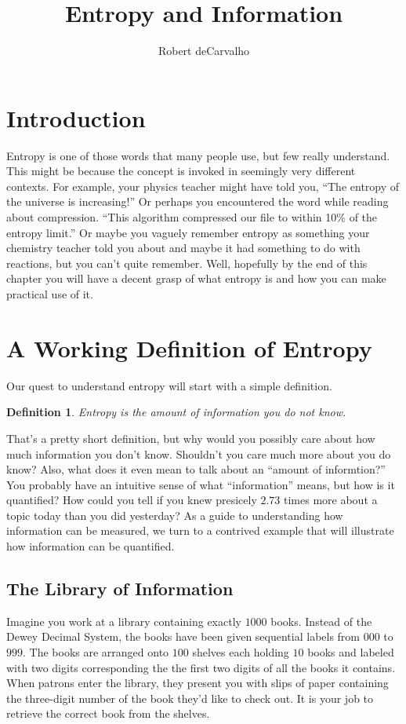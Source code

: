 \documentclass[11pt, oneside]{article}   	%
\title{Entropy and Information}
\author{Robert deCarvalho}
\date{}							%
\newtheorem{definition}{Definition}
\begin{document}
\maketitle


\section{Introduction}
Entropy is one of those words that many people use, but few really understand.
This might be because the concept is invoked in seemingly very different
contexts.  For example, your physics teacher might have told you, ``The entropy
of the universe is increasing!'' Or perhaps you encountered the word while
reading about compression. ``This algorithm compressed our file to within
10\% of the entropy limit.''  Or maybe you vaguely remember entropy as something
your chemistry teacher told you about and maybe it had something to do with
reactions, but you can't quite remember.  Well, hopefully by the end of this
chapter you will have a decent grasp of what entropy is and how you can make
practical use of it.


\section{A Working Definition of Entropy}
Our quest to understand entropy will start with a simple definition.
\begin{definition}
    Entropy is the amount of information you do not know.
\end{definition}
That's a pretty short definition, but why would you possibly care about how much
information you don't know.  Shouldn't you care much more about you do know?
Also, what does it even mean to talk about an ``amount of informtion?'' You
probably have an intuitive sense of what ``information'' means, but how is it
quantified?  How could you tell if you knew presicely $2.73$ times more about a
topic today than you did yesterday?  As a guide to understanding how information
can be measured, we turn to a contrived example that will illustrate how
information can be quantified.


\subsection{The Library of Information}
Imagine you work at a library containing exactly $1000$ books.  Instead of the
Dewey Decimal System, the books have been given sequential labels from $000$ to
$999$.  The books are arranged onto $100$ shelves each holding $10$ books and
labeled with  two digits corresponding the the first two digits of all the books
it contains.  When patrons enter the library, they present you with slips of
paper containing the three-digit number of the book they'd like to check out.
It is your job to retrieve the correct book from the shelves.
\end{document}
